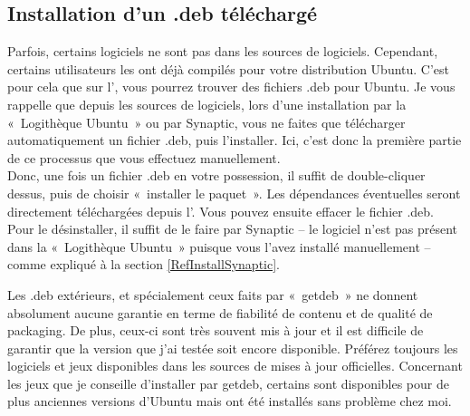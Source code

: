\subsection{Installation d'un .deb téléchargé}
Parfois, certains logiciels ne sont pas dans les sources de logiciels. Cependant, certains utilisateurs les ont déjà compilés pour votre distribution Ubuntu. C'est pour cela que sur l', vous pourrez trouver des fichiers .deb pour Ubuntu. Je vous rappelle que depuis les sources de logiciels, lors d'une installation par la «~Logithèque Ubuntu~» ou par Synaptic, vous ne faites que télécharger automatiquement un fichier .deb, puis l'installer. Ici, c'est donc la première partie de ce processus que vous effectuez manuellement.\\
Donc, une fois un fichier .deb en votre possession, il suffit de double-cliquer dessus, puis de choisir «~installer le paquet~». Les dépendances éventuelles seront directement téléchargées depuis l'. Vous pouvez ensuite effacer le fichier .deb.\\
Pour le désinstaller, il suffit de le faire par Synaptic -- le logiciel n'est pas présent dans la «~Logithèque Ubuntu~» puisque vous l'avez installé manuellement -- comme expliqué à la section \ref{RefInstallSynaptic}.\par
\begin{attention}
Les .deb extérieurs, et spécialement ceux faits par «~getdeb~» ne donnent absolument aucune garantie en terme de fiabilité de contenu et de qualité de packaging. De plus, ceux-ci sont très souvent mis à jour et il est difficile de garantir que la version que j'ai testée soit encore disponible. Préférez toujours les logiciels et jeux disponibles dans les sources de mises à jour officielles. Concernant les jeux que je conseille d'installer par getdeb, certains sont disponibles pour de plus anciennes versions d'Ubuntu mais ont été installés sans problème chez moi.
\end{attention}
